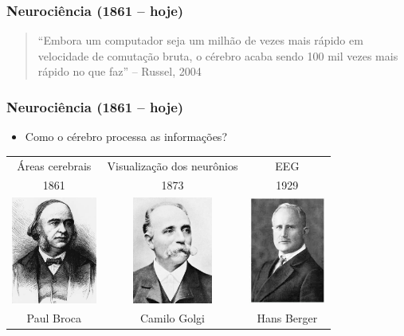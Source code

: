 \documentclass[aspectratio=169]{beamer}
\begin{document}
	\begin{frame}
		\frametitle{Neurociência (1861 – hoje)}
		\begin{quote}
			“Embora um computador seja um milhão de vezes mais rápido em velocidade de comutação bruta, o cérebro acaba sendo 100 mil vezes mais rápido no que faz” – Russel, 2004
		\end{quote}
	\end{frame}
	
	\begin{frame}
		\frametitle{Neurociência (1861 – hoje)}
		\begin{itemize}
			\item Como o cérebro processa as informações? 
		\end{itemize}
					\begin{table}
				\centering
				\begin{tabular}{c c c}	
					Áreas cerebrais & Visualização dos neurônios & EEG			\\
					1861 & 1873 & 1929 \\
					\includegraphics[height=3.5cm, keepaspectratio]{../figs/cap01/broca.jpg} &				
					\includegraphics[height=3.5cm, keepaspectratio]{../figs/cap01/golgi.jpg} &				
					\includegraphics[height=3.5cm, keepaspectratio]{../figs/cap01/berger.jpg}  
					\\
					Paul Broca & Camilo Golgi & Hans Berger 		
					
				\end{tabular}
			\end{table}
	\end{frame}	
	
\end{document}
